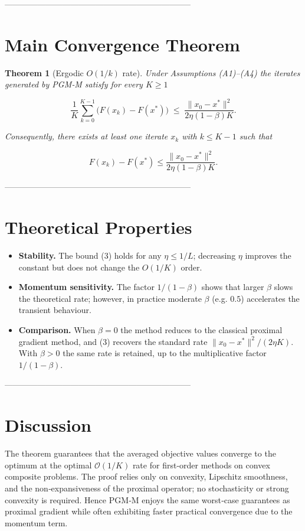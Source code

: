 \documentclass{article}
\newtheorem{theorem}{Theorem}
\begin{document}
--------------------------------------------------------------------

\section*{Main Convergence Theorem}
\begin{theorem}[Ergodic \(O(1/k)\) rate]\label{thm:main}
Under Assumptions (A1)–(A4) the iterates generated by
PGM‑M satisfy for every \(K\ge1\)

\[
\frac{1}{K}\sum_{k=0}^{K-1}\bigl(F(x_{k})-F(x^{*})\bigr)
\;\le\;
\frac{\|x_{0}-x^{*}\|^{2}}{2\eta(1-\beta)K}. \tag{3}
\]

Consequently, there exists at least one iterate
\(x_{k}\) with \(k\le K-1\) such that  

\[
F(x_{k})-F(x^{*})\le\frac{\|x_{0}-x^{*}\|^{2}}{2\eta(1-\beta)K}. \tag{4}
\]
\end{theorem}

--------------------------------------------------------------------

\section*{Theoretical Properties}
\begin{itemize}
\item \textbf{Stability.} The bound (3) holds for any
\(\eta\le 1/L\); decreasing \(\eta\) improves the constant but does not change the \(O(1/K)\) order.
\item \textbf{Momentum sensitivity.} The factor \(1/(1-\beta)\) shows that larger \(\beta\) slows the
theoretical rate; however, in practice moderate \(\beta\) (e.g. \(0.5\)) accelerates the transient behaviour.
\item \textbf{Comparison.} 
When \(\beta=0\) the method reduces to the classical proximal gradient method,
and (3) recovers the standard rate \(\|x_{0}-x^{*}\|^{2}/(2\eta K)\).
With \(\beta>0\) the same rate is retained, up to the multiplicative factor
\(1/(1-\beta)\).
\end{itemize}

--------------------------------------------------------------------

\section*{Discussion}
The theorem guarantees that the averaged objective values converge
to the optimum at the optimal \(\mathcal{O}(1/K)\) rate for first‑order
methods on convex composite problems. The proof relies only on
convexity, Lipschitz smoothness, and the non‑expansiveness of the
proximal operator; no stochasticity or strong convexity is required.
Hence PGM‑M enjoys the same worst‑case guarantees as proximal gradient
while often exhibiting faster practical convergence due to the
momentum term.
\end{document}
